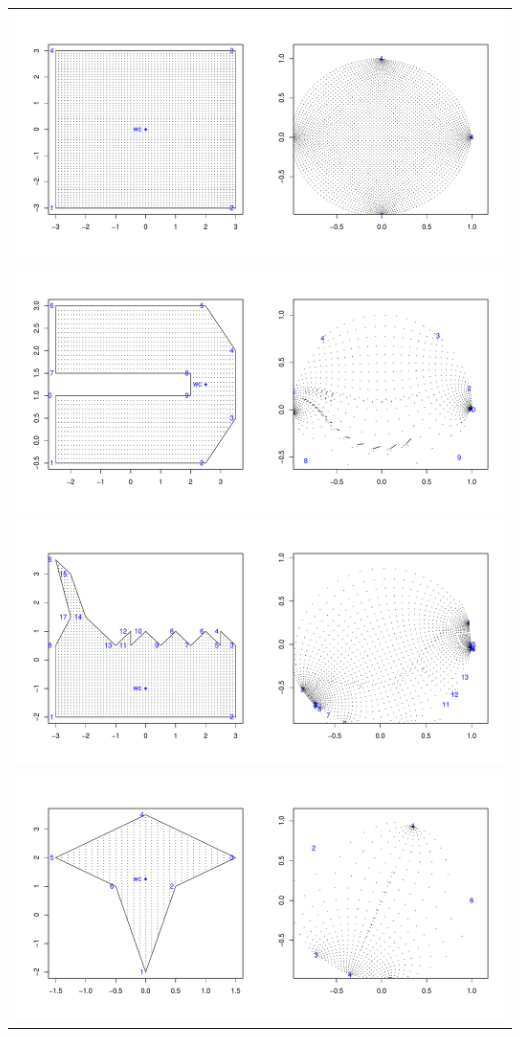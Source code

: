 \documentclass[a4paper,10pt]{amsart}
\begin{document}
\begin{table}
\centering
\begin{tabular}{c}  
\includegraphics[scale=0.25]{figs/R-test-1.pdf} \\
\includegraphics[scale=0.25]{figs/R-test-2.pdf} \\
\includegraphics[scale=0.25]{figs/R-test-3.pdf} \\
\includegraphics[scale=0.25]{figs/R-test-4.pdf} \\

\end{tabular}
\end{table}
\end{document}
